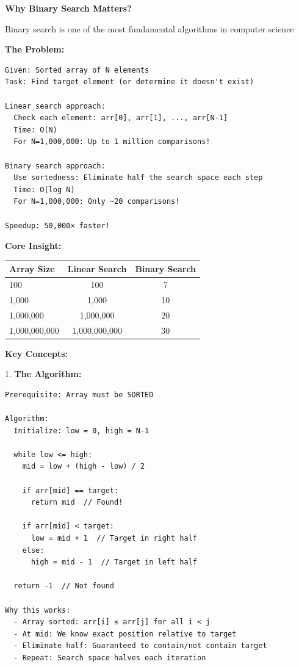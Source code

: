 \documentclass[11pt,a4paper,oneside]{book}
\begin{document}
\begin{tcolorbox}[
    enhanced,breakable,
    colback=white,
    colframe=deepblue,
    boxrule=1.5pt,
    arc=3mm,
    title=\textbf{The Divide and Conquer Paradigm}
]
\textbf{Why Binary Search Matters?}

Binary search is one of the most fundamental algorithms in computer science

\textbf{The Problem:}
\begin{verbatim}
Given: Sorted array of N elements
Task: Find target element (or determine it doesn't exist)

Linear search approach:
  Check each element: arr[0], arr[1], ..., arr[N-1]
  Time: O(N)
  For N=1,000,000: Up to 1 million comparisons!

Binary search approach:
  Use sortedness: Eliminate half the search space each step
  Time: O(log N)
  For N=1,000,000: Only ~20 comparisons!
  
Speedup: 50,000× faster!
\end{verbatim}

\textbf{Core Insight:}
\begin{center}
\begin{tabular}{|l|c|c|}
\hline
\rowcolor{lightgray}
\textbf{Array Size} & \textbf{Linear Search} & \textbf{Binary Search} \\
\hline
100 & 100 & 7 \\
\hline
1,000 & 1,000 & 10 \\
\hline
1,000,000 & 1,000,000 & 20 \\
\hline
1,000,000,000 & 1,000,000,000 & 30 \\
\hline
\end{tabular}
\end{center}

\textbf{Key Concepts:}

1. \textbf{The Algorithm:}
\begin{verbatim}
Prerequisite: Array must be SORTED

Algorithm:
  Initialize: low = 0, high = N-1
  
  while low <= high:
    mid = low + (high - low) / 2
    
    if arr[mid] == target:
      return mid  // Found!
    
    if arr[mid] < target:
      low = mid + 1  // Target in right half
    else:
      high = mid - 1  // Target in left half
  
  return -1  // Not found

Why this works:
  - Array sorted: arr[i] ≤ arr[j] for all i < j
  - At mid: We know exact position relative to target
  - Eliminate half: Guaranteed to contain/not contain target
  - Repeat: Search space halves each iteration
\end{verbatim}


\end{tcolorbox}
\end{document}
